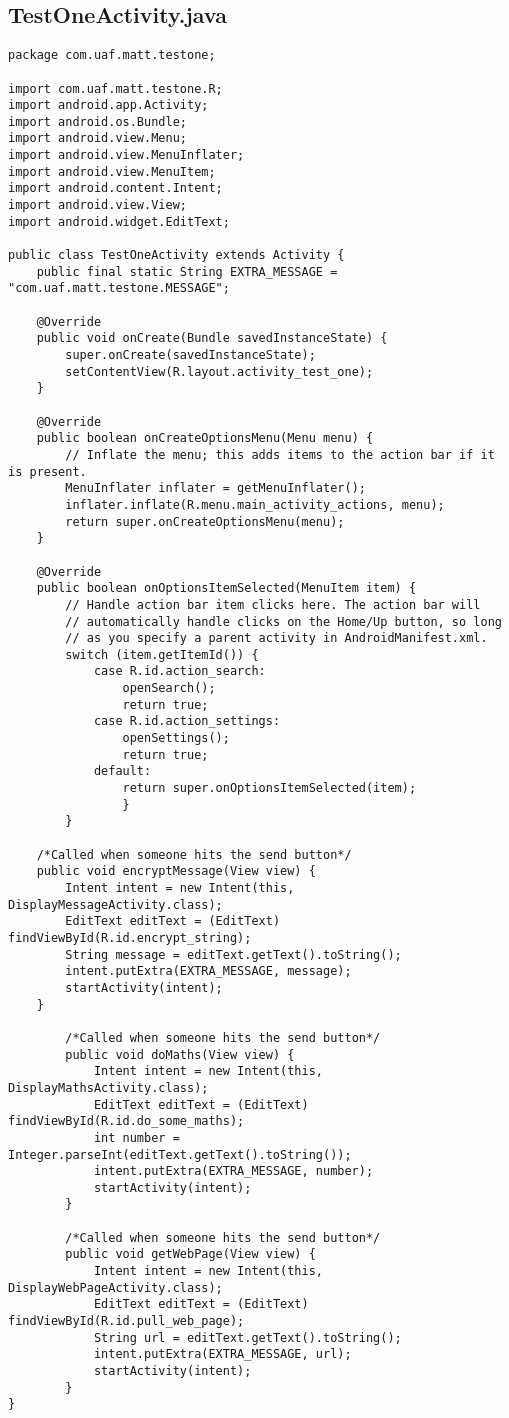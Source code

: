 \subsection{TestOneActivity.java}
\label{app:camainactivity}
\begin{lstlisting}
package com.uaf.matt.testone;

import com.uaf.matt.testone.R;
import android.app.Activity;
import android.os.Bundle;
import android.view.Menu;
import android.view.MenuInflater;
import android.view.MenuItem;
import android.content.Intent;
import android.view.View;
import android.widget.EditText;

public class TestOneActivity extends Activity {
    public final static String EXTRA_MESSAGE = "com.uaf.matt.testone.MESSAGE";

    @Override
    public void onCreate(Bundle savedInstanceState) {
        super.onCreate(savedInstanceState);
        setContentView(R.layout.activity_test_one);
    }

    @Override
    public boolean onCreateOptionsMenu(Menu menu) {
        // Inflate the menu; this adds items to the action bar if it is present.
        MenuInflater inflater = getMenuInflater();
        inflater.inflate(R.menu.main_activity_actions, menu);
        return super.onCreateOptionsMenu(menu);
    }

    @Override
    public boolean onOptionsItemSelected(MenuItem item) {
        // Handle action bar item clicks here. The action bar will
        // automatically handle clicks on the Home/Up button, so long
        // as you specify a parent activity in AndroidManifest.xml.
        switch (item.getItemId()) {
            case R.id.action_search:
                openSearch();
                return true;
            case R.id.action_settings:
                openSettings();
                return true;
            default:
                return super.onOptionsItemSelected(item);
                }
        }

    /*Called when someone hits the send button*/
    public void encryptMessage(View view) {
        Intent intent = new Intent(this, DisplayMessageActivity.class);
        EditText editText = (EditText) findViewById(R.id.encrypt_string);
        String message = editText.getText().toString();
        intent.putExtra(EXTRA_MESSAGE, message);
        startActivity(intent);
    }

        /*Called when someone hits the send button*/
        public void doMaths(View view) {
            Intent intent = new Intent(this, DisplayMathsActivity.class);
            EditText editText = (EditText) findViewById(R.id.do_some_maths);
            int number = Integer.parseInt(editText.getText().toString());
            intent.putExtra(EXTRA_MESSAGE, number);
            startActivity(intent);
        }

        /*Called when someone hits the send button*/
        public void getWebPage(View view) {
            Intent intent = new Intent(this, DisplayWebPageActivity.class);
            EditText editText = (EditText) findViewById(R.id.pull_web_page);
            String url = editText.getText().toString();
            intent.putExtra(EXTRA_MESSAGE, url);
            startActivity(intent);
        }
}
\end{lstlisting}
